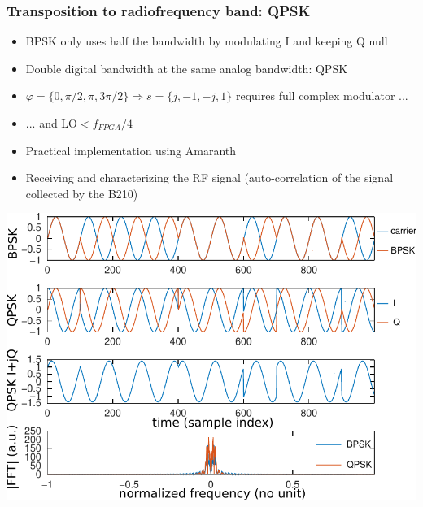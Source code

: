 \documentclass[compress,10pt,aspectratio=169]{beamer}
\begin{document}
\begin{frame}\frametitle{Transposition to radiofrequency band: QPSK}

\begin{minipage}[t]{\linewidth}
\begin{minipage}{.39\linewidth}
\begin{itemize}
\item BPSK only uses half the bandwidth by modulating I and keeping Q null
\item Double digital bandwidth at the same analog bandwidth: QPSK 
\item $\varphi=\{0,\pi/2,\pi,3\pi/2\}\Rightarrow s=\{j,-1,-j,1\}$ requires full complex modulator ...
\item ... and LO$< f_{FPGA}/4$
\item Practical implementation using Amaranth
\item Receiving and characterizing the RF signal (auto-correlation of the signal collected by the B210)
\end{itemize}
\end{minipage}
\begin{minipage}{.59\linewidth}
\includegraphics[width=1.13\linewidth]{bpsk_qpsk}
\end{minipage}
\end{minipage}
\end{frame}
\end{document}
